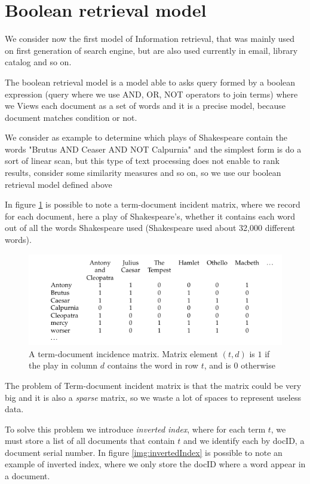 \section{Boolean retrieval model}
We consider now the first model of Information retrieval, that was mainly used on first generation of search engine,
but are also used currently in email, library catalog and so on.

\begin{defi}
The boolean retrieval model is a model able to asks query formed by a boolean expression (query where we use 
AND, OR, NOT operators to join terms) where we Views each document as a set of words and it is a precise model,
because document matches condition or not.
\end{defi}

We consider as example to determine which plays of Shakespeare contain the words 
"Brutus AND Ceaser AND NOT Calpurnia" and the simplest form is do a sort of linear scan, but this type
of text processing does not enable to rank results, consider some similarity measures and so on, so we use 
our boolean retrieval model defined above 

In figure \ref{img:booleanMatrix} is possible to note a term-document incident matrix, where we 
record for each document, here a play of Shakespeare’s, whether it contains each word 
out of all the words Shakespeare used (Shakespeare used about 32,000 different words).

\begin{figure}
    \caption{A term-document incidence matrix. Matrix element $(t, d)$ is $1$ if the play in column $d$
             contains the word in row $t$, and is $0$ otherwise}
    \label{img:booleanMatrix}
    \includegraphics[width=\textwidth]{Images/booleanMatrix}
\end{figure}
The problem of Term-document incident matrix is that the matrix could be very big and it is also a \emph{sparse}
matrix, so we waste a lot of spaces to represent useless data.

To solve this problem we introduce \emph{inverted index}, where for each term $t$, we must store a list 
of all documents that contain $t$ and we identify each by docID, a document serial number.\newline
In figure \ref{img:invertedIndex} is possible to note an example of inverted index, where we only store the docID
where a word appear in a document.


